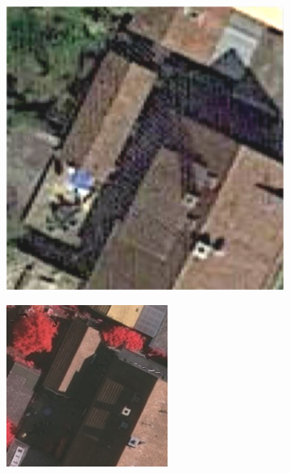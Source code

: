 \begin{figure}[H]
\begin{subfigure}{0.19\columnwidth}
\end{subfigure}


\begin{subfigure}{0.19\columnwidth}
  \centering
  \includegraphics[width=1\linewidth]{fig/comp_manual/building28_google.jpg}
\end{subfigure}
\begin{subfigure}{0.19\columnwidth}
  \centering
  \includegraphics[width=1\linewidth]{fig/comp_manual/building_28_rgb.png}  

\end{subfigure}
\end{figure}
